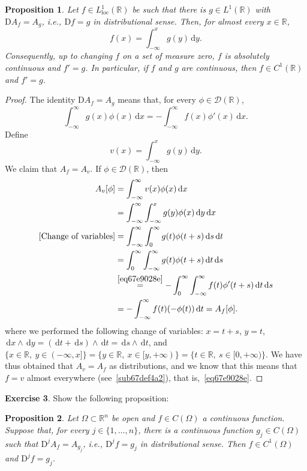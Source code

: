 \documentclass[a4paper,9pt]{amsart}
\newcommand{\scr}[1]{\mathscr{#1}}
\newcommand{\R}{\mathbb{R}}	%
\newcommand{\did}{\,\mathrm{d}}	%
\newcommand{\Diff}{\mathrm{D}}
\newcommand{\loc}{\mathrm{loc}}
\theoremstyle{plain}
\newtheorem{proposition}{Proposition}[section]
\theoremstyle{definition}
\newtheorem{exercise}[proposition]{Exercise}%
\theoremstyle{remark}
\begin{document}
\begin{proposition}
	Let $f\in L^1_\loc(\R)$ be such that there is $g\in L^1(\R)$ with 
	$\Diff A_f = A_g$, i.e., $\Diff f = g$ in distributional sense.
	Then, for almost every $x\in\R$,
	\begin{equation}
		f(x) = \int_{-\infty}^x g(y)\did y .
	\end{equation}
	Consequently, up to changing $f$ on a set of measure zero, $f$ is absolutely continuous and $f'=g$.
	In particular, if $f$ and $g$ are continuous, then $f\in C^1(\R)$ and $f'=g$.
\end{proposition}
\begin{proof}
	The identity $\Diff A_f = A_g$ means that, for every $\phi\in\scr D(\R)$,
	\begin{equation}\label{eq67e9028e}
		\int_{-\infty}^\infty g(x) \phi(x) \did x
		= - \int_{-\infty}^\infty f(x) \phi'(x) \did x .
	\end{equation}
	Define
	\begin{equation}
		v(x) = \int_{-\infty}^x g(y)\did y .
	\end{equation}
	We claim that $A_f = A_v$.
	If $\phi\in\scr D(\R)$, then
	\begin{align*}
	 	A_v [\phi] 
		&= \int_{-\infty}^\infty v(x) \phi(x) \did x \\
		&= \int_{-\infty}^\infty \int_{-\infty}^x g(y) \phi(x) \did y\did x \\
		[\text{Change of variables}]
		&= \int_{-\infty}^\infty \int_0^\infty g(t) \phi(t+s) \did s\did t \\
		&= \int_0^\infty\int_{-\infty}^\infty  g(t) \phi(t+s) \did t\did s \\
		&\overset{\eqref{eq67e9028e}}= -\int_0^\infty \int_{-\infty}^\infty  f(t) \phi'(t+s) \did t\did s \\
		&= - \int_{-\infty}^\infty  f(t) (-\phi(t)) \did t 
		= A_f[\phi] .
	\end{align*}
	where we performed the following change of variables:
	$x=t+s$, $y=t$, $\did x\wedge\did y = (\did t+\did s)\wedge\did t = \did s\wedge\did t$, and $\{x\in\R,\ y\in(-\infty,x]\} = \{y\in\R,\ x\in[y,+\infty)\} = \{t\in\R,\ s\in[0,+\infty)\}$.
	We have thus obtained that $A_v=A_f$ as distributions, 
	and we know that this means that $f=v$ almost everywhere (see~\ref{sub67def4a2}),
	that is,~\eqref{eq67e9028e}.
\end{proof}

\begin{exercise}
	Show the following proposition:
	
	\begin{proposition}
		Let $\Omega\subset\R^n$ be open
		and $f\in C(\Omega)$ a continuous function.
		Suppose that, for every $j\in\{1,\dots,n\}$, there is a continuous function $g_j\in C(\Omega)$ such that $\Diff^jA_f = A_{g_j}$, i.e., $\Diff^jf=g_j$ in distributional sense.
		Then $f\in C^1(\Omega)$ and $\Diff^jf = g_j$.
	\end{proposition}
\end{exercise}
\end{document}
